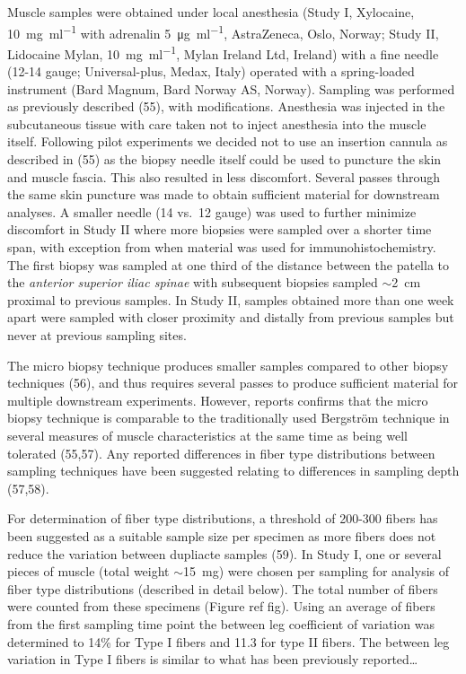 \documentclass[twoside,10pt]{gihclass} %
\begin{document}
Muscle samples were obtained under local anesthesia (Study I, Xylocaine, \SI{10}{\mg\per\ml} with adrenalin \SI{5}{\micro\gram\per\ml}, AstraZeneca, Oslo, Norway; Study II, Lidocaine Mylan, \SI{10}{\mg\per\ml}, Mylan Ireland Ltd, Ireland) with a fine needle (12-14 gauge; Universal-plus, Medax, Italy) operated with a spring-loaded instrument (Bard Magnum, Bard Norway AS, Norway). Sampling was performed as previously described
(55),
with modifications. Anesthesia was injected in the subcutaneous tissue with care taken not to inject anesthesia into the muscle itself. Following pilot experiments we decided not to use an insertion cannula as described in (55) as the biopsy needle itself could be used to puncture the skin and muscle fascia. This also resulted in less discomfort. Several passes through the same skin puncture was made to obtain sufficient material for downstream analyses. A smaller needle (14 vs.~12 gauge) was used to further minimize discomfort in Study II where more biopsies were sampled over a shorter time span, with exception from when material was used for immunohistochemistry. The first biopsy was sampled at one third of the distance between the patella to the \emph{anterior superior iliac spinae} with subsequent biopsies sampled \(\sim\)\SI{2}{cm} proximal to previous samples. In Study II, samples obtained more than one week apart were sampled with closer proximity and distally from previous samples but never at previous sampling sites.

The micro biopsy technique produces smaller samples compared to other biopsy techniques
(56), and thus requires several passes to produce sufficient material for multiple downstream experiments. However, reports confirms that the micro biopsy technique is comparable to the traditionally used Bergström technique in several measures of muscle characteristics at the same time as being well tolerated
(55,57).
Any reported differences in fiber type distributions between sampling techniques have been suggested relating to differences in sampling depth
(57,58).

For determination of fiber type distributions, a threshold of 200-300 fibers has been suggested as a suitable sample size per specimen as more fibers does not reduce the variation between dupliacte samples
(59).
In Study I, one or several pieces of muscle (total weight \(\sim\)\SI{15}{mg}) were chosen per sampling for analysis of fiber type distributions (described in detail below). The total number of fibers were counted from these specimens (Figure ref fig). Using an average of fibers from the first sampling time point the between leg coefficient of variation was determined to 14\% for Type I fibers and 11.3 for type II fibers. The between leg variation in Type I fibers is similar to what has been previously reported\ldots{}
\end{document}
